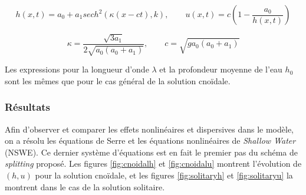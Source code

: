 \begin{equation*}
    h(x,t) = a_0 + a_1 sech^2(\kappa(x-ct),k), \qquad
    u(x,t) = c\left( 1 - \frac{a_0}{h(x,t)}\right)
\end{equation*}

\begin{equation*}
    \kappa = \frac{\sqrt{3a_1}}{2\sqrt{a_0(a_0+a_1)}}, \qquad
    c = \sqrt{g a_0(a_0+a_1)}
\end{equation*}

\indent Les expressions pour la longueur d'onde $\lambda$ et la profondeur moyenne de l'eau $h_0$ sont les mêmes que pour le cas général de la solution cnoïdale.

\subsubsection{Résultats}

\indent Afin d'observer et comparer les effets nonlinéaires et dispersives dans le modèle, on a résolu les équations de Serre et les équations nonlinéaires de \emph{Shallow Water} (NSWE). Ce dernier système d'équations est en fait le premier pas du schéma de \emph{splitting} proposé. Les figures \ref{fig:cnoidalh} et \ref{fig:cnoidalu} montrent l'évolution de $(h,u)$ pour la solution cnoïdale, et les figures  \ref{fig:solitaryh} et \ref{fig:solitaryu} la montrent dans le cas de la solution solitaire. 

